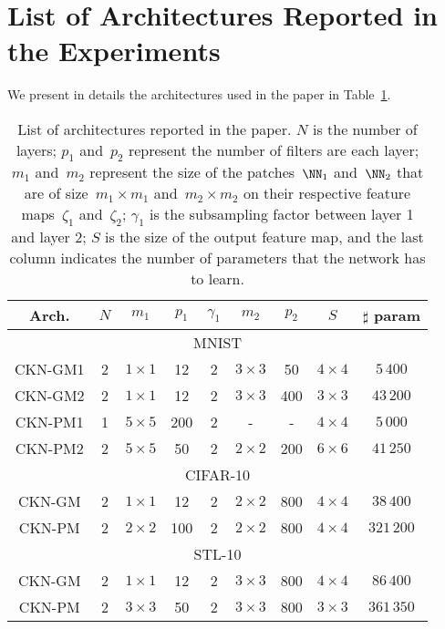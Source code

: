 \section{List of Architectures Reported in the Experiments}\label{appendix:arch}
We present in details the architectures used in the paper in Table~\ref{table:arch}.
\begin{table}[hbtp]
   \centering
   \begin{tabular}{|*{9}{c|}}
      \hline
      Arch. & $N$ & $m_1$  & $p_1$  &  $\gamma_1$ & $m_2$ &  $p_2$ & $S$  &  $\sharp$ param\\
      \hline
      \hline
      \multicolumn{9}{|c|}{MNIST} \\
      \hline
      CKN-GM1 & 2 &  $1 \times 1$  &  12  & 2 &  $3 \times 3$ &  50 &  $4 \times 4$ & $5\,400$\\
      \hline
      CKN-GM2 & 2 &  $1 \times 1$  &  12  & 2 &  $3 \times 3$ &  400 &  $3 \times 3$& $43\,200$ \\
      \hline
      CKN-PM1 & 1 &  $5 \times 5$  &  200  & 2 &  - &  - &  $4 \times 4$  & $5\,000$ \\
      \hline
      CKN-PM2 & 2 &  $5 \times 5$  &  50  & 2 &  $2 \times 2$ &  200 &  $6 \times 6$ & $41\,250$ \\
      \hline
      \hline
      \multicolumn{9}{|c|}{CIFAR-10} \\
      \hline
      CKN-GM & 2 &  $1 \times 1$  &  12  & 2 &  $2 \times 2$ & 800 &  $4 \times 4$ & $38\,400$\\
      \hline
      CKN-PM & 2 &  $2 \times 2$  &  100  & 2 &  $2 \times 2$ &  800 &  $4 \times 4$ & $321\,200$\\
      \hline
      \hline
      \multicolumn{9}{|c|}{STL-10} \\
      \hline
      CKN-GM & 2 &  $1 \times 1$  &  12  & 2 &  $3 \times 3$ & 800 &  $4 \times 4$ & $86\,400$\\
      \hline
      CKN-PM & 2 &  $3 \times 3$  &  50  & 2 &  $3 \times 3$ &  800 &  $3 \times 3$ & $361\,350$\\
      \hline

   \end{tabular}
   \caption{List of architectures reported in the paper. $N$ is the number of layers; $p_1$ and~$p_2$ represent the number of filters are each layer; $m_1$ and~$m_2$ represent the size of the patches~$\NN_1$ and~$\NN_2$ that are of size~$m_1 \times m_1$ and~$m_2 \times m_2$ on their respective feature maps~$\zeta_1$ and~$\zeta_2$; $\gamma_1$ is the subsampling factor between layer 1 and layer 2; $S$ is the size of the output feature map, and the last column indicates the number of parameters that the network has to learn.}
   \label{table:arch}
\end{table}

